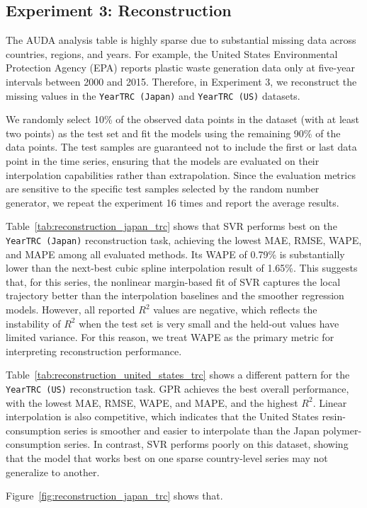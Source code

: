 \subsection{Experiment 3: Reconstruction}

The AUDA analysis table is highly sparse due to substantial missing data across countries, regions, and years. For example, the United States Environmental Protection Agency (EPA) reports plastic waste generation data only at five-year intervals between 2000 and 2015. Therefore, in Experiment 3, we reconstruct the missing values in the \texttt{YearTRC (Japan)} and \texttt{YearTRC (US)} datasets.

We randomly select 10\% of the observed data points in the dataset (with at least two points) as the test set and fit the models using the remaining 90\% of the data points. The test samples are guaranteed not to include the first or last data point in the time series, ensuring that the models are evaluated on their interpolation capabilities rather than extrapolation. Since the evaluation metrics are sensitive to the specific test samples selected by the random number generator, we repeat the experiment 16 times and report the average results.




Table~\ref{tab:reconstruction_japan_trc} shows that SVR performs best on the \texttt{YearTRC (Japan)} reconstruction task, achieving the lowest MAE, RMSE, WAPE, and MAPE among all evaluated methods. Its WAPE of 0.79\% is substantially lower than the next-best cubic spline interpolation result of 1.65\%. This suggests that, for this series, the nonlinear margin-based fit of SVR captures the local trajectory better than the interpolation baselines and the smoother regression models. However, all reported \(R^2\) values are negative, which reflects the instability of \(R^2\) when the test set is very small and the held-out values have limited variance. For this reason, we treat WAPE as the primary metric for interpreting reconstruction performance.

Table~\ref{tab:reconstruction_united_states_trc} shows a different pattern for the \texttt{YearTRC (US)} reconstruction task. GPR achieves the best overall performance, with the lowest MAE, RMSE, WAPE, and MAPE, and the highest \(R^2\). Linear interpolation is also competitive, which indicates that the United States resin-consumption series is smoother and easier to interpolate than the Japan polymer-consumption series. In contrast, SVR performs poorly on this dataset, showing that the model that works best on one sparse country-level series may not generalize to another.



Figure~\ref{fig:reconstruction_japan_trc} shows that.
